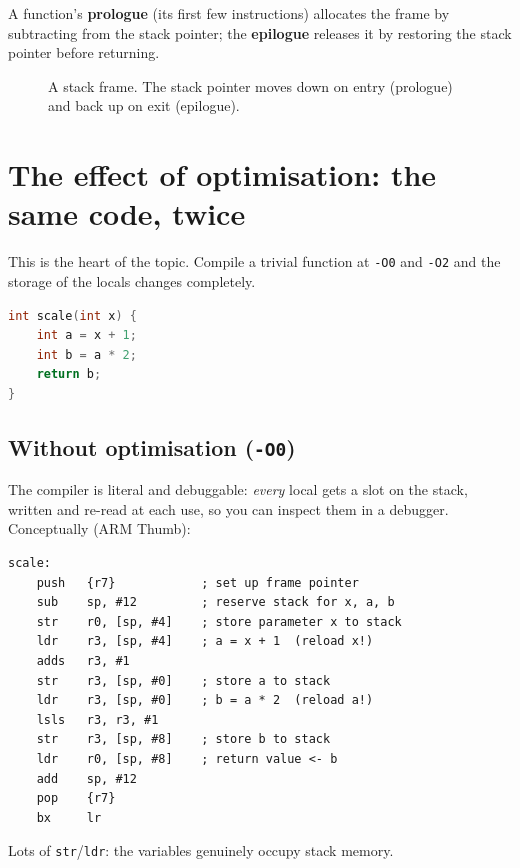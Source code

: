 \documentclass[11pt,a4paper,oneside]{book}
\newcommand{\code}[1]{\texttt{#1}}
\begin{document}
A function's \textbf{prologue} (its first few instructions) allocates the frame
by subtracting from the stack pointer; the \textbf{epilogue} releases it by
restoring the stack pointer before returning.

\begin{figure}[h]
\centering
{}
\caption{A stack frame. The stack pointer moves down on entry (prologue) and
back up on exit (epilogue).}
\label{fig:stackframe}
\end{figure}

\section{The effect of optimisation: the same code, twice}
This is the heart of the topic. Compile a trivial function at \code{-O0} and
\code{-O2} and the storage of the locals changes completely.

\begin{lstlisting}[language=C,caption={The source.}]
int scale(int x) {
    int a = x + 1;
    int b = a * 2;
    return b;
}
\end{lstlisting}

\subsection{Without optimisation (\texttt{-O0})}
The compiler is literal and debuggable: \emph{every} local gets a slot on the
stack, written and re-read at each use, so you can inspect them in a debugger.
Conceptually (ARM Thumb):
\begin{lstlisting}[style=asm]
scale:
    push   {r7}            ; set up frame pointer
    sub    sp, #12         ; reserve stack for x, a, b
    str    r0, [sp, #4]    ; store parameter x to stack
    ldr    r3, [sp, #4]    ; a = x + 1  (reload x!)
    adds   r3, #1
    str    r3, [sp, #0]    ; store a to stack
    ldr    r3, [sp, #0]    ; b = a * 2  (reload a!)
    lsls   r3, r3, #1
    str    r3, [sp, #8]    ; store b to stack
    ldr    r0, [sp, #8]    ; return value <- b
    add    sp, #12
    pop    {r7}
    bx     lr
\end{lstlisting}
Lots of \code{str}/\code{ldr}: the variables genuinely occupy stack memory.
\end{document}
